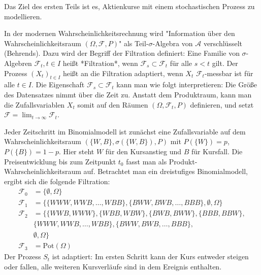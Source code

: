 Das Ziel des ersten Teils ist es, Aktienkurse mit einem stochastischen Prozess 
zu modellieren.

\begin{defi}[Adaptiertheit]
In der modernen Wahrscheinlichkeitsrechnung wird "Information über den
Wahrscheinlichkeitsraum $(\Omega, \mathcal F, P)$" als Teil-$\sigma$-Algebra 
von $\mathcal A$ verschlüsselt (Behrends). Dazu wird der Begriff der Filtration 
definiert: Eine Familie von $\sigma$-Algebren $\mathcal F_t, t \in I$ heißt *Filtration*, 
wenn $\mathcal F_s \subset \mathcal F_t$ für alle $s \lt t$ gilt. 
Der Prozess $(X_t)_{t \in I}$ heißt an die Filtration adaptiert, 
wenn $X_t$ $\mathcal F_t$-messbar ist für alle $t \in I$. Die Eigenschaft 
$\mathcal F_s \subset \mathcal F_t$ kann man wie folgt interpretieren: 
Die Größe des Datensatzes nimmt über die Zeit zu. Anstatt dem Produktraum, kann man 
die Zufallsvariablen $X_t$ somit auf den Räumen $(\Omega, \mathcal F_t, P)$ definieren, 
und setzt $\mathcal F = \lim_{t \to \infty} \mathcal F_t$.

\end{defi}

\begin{bsp}
Jeder Zeitschritt im Binomialmodell ist zunächst eine Zufallsvariable auf dem 
Wahrscheinlichkeitsraum $(\{W, B\}, \sigma(\{W, B\}), P)$ mit 
$P(\{W \}) = p$, $P(\{B \}) = 1-p$. Hier steht $W$ für den Kursanstieg und $B$ für Kursfall. Die Preisentwicklung bis zum Zeitpunkt $t_0$ fasst man als Produkt-Wahrscheinlichkeitsraum auf.
Betrachtet man ein dreistufiges Binomialmodell, ergibt sich die folgende Filtration: 
$$
\begin{aligned}
\mathcal F_0 &= \{\emptyset, \Omega\} \\
\mathcal F_1 &= \{\{WWW, WWB, \dots, WBB \}, \{ BWW, BWB, \dots, BBB \},\emptyset, \Omega \} \\ 
\mathcal F_2 &= \{ \{WWB, WWW \}, \{WBB, WBW \}, \{BWB, BWW \}, \{BBB, BBW \}, \\ &\{WWW, WWB, \dots, WBB \}, \{ BWW, BWB, \dots, BBB \}, \\ &\emptyset, \Omega \} \\
\mathcal F_3 &= \text{Pot}(\Omega)
\end{aligned}
$$
Der Prozess $S_t$ ist adaptiert: Im ersten Schritt kann der Kurs entweder steigen oder
fallen, alle weiteren Kursverläufe sind in dem Ereignis enthalten.

\end{bsp}

